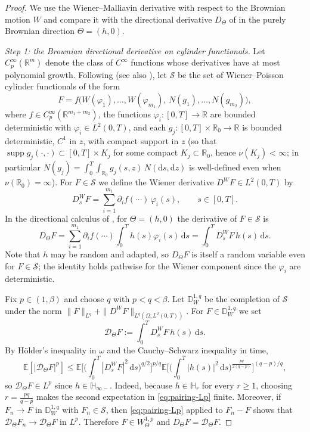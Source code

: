 \documentclass[11pt]{article}
\newcommand{\R}{\mathbb{R}}
\newcommand{\E}{\mathbb{E}}
\newcommand{\Hb}{\mathbb{H}}
\newcommand{\1}{\mathbf{1}}
\newcommand{\dd}{\mathrm{d}}
\newcommand{\supp}{\operatorname{supp}}
\theoremstyle{plain}
\theoremstyle{definition}
\theoremstyle{remark}
\begin{document}
\begin{proof}
We use the Wiener--Malliavin derivative with respect to the Brownian motion $W$ and compare it with the directional derivative $D_\Theta$
of \cite{NakagawaSuzuki2024,SongXie2018} in the purely Brownian direction $\Theta=(h,0)$.

\medskip
\noindent\emph{Step 1: the Brownian directional derivative on cylinder functionals.}
Let $C_p^\infty(\R^m)$ denote the class of $C^\infty$ functions whose derivatives have at most polynomial growth.
Following \cite[Section~2.2]{SongXie2018} (see also \cite[Definition~3.1]{NakagawaSuzuki2024}),
let $\mathcal{S}$ be the set of Wiener--Poisson cylinder functionals of the form
\[
F=f\big(W(\varphi_1),\dots,W(\varphi_{m_1}),\,N(g_1),\dots,N(g_{m_2})\big),
\]
where $f\in C_p^\infty(\R^{m_1+m_2})$, the functions $\varphi_i:[0,T]\to\R$ are bounded deterministic with $\varphi_i\in L^2(0,T)$,
and each $g_j:[0,T]\times\R_0\to\R$ is bounded deterministic, $C^1$ in $z$, with compact support in $z$ (so that $\supp g_j(\cdot,\cdot)\subset[0,T]\times K_j$ for some compact $K_j\subset\R_0$, hence $\nu(K_j)<\infty$; in particular $N(g_j)=\int_0^T\int_{\R_0}g_j(s,z)\,N(\dd s,\dd z)$ is well-defined even when $\nu(\R_0)=\infty$).
For $F\in\mathcal{S}$ we define the Wiener derivative $D^W F\in L^2(0,T)$ by
\[
D_s^W F=\sum_{i=1}^{m_1}\partial_i f(\cdots)\,\varphi_i(s),\qquad s\in[0,T].
\]
In the directional calculus of \cite{NakagawaSuzuki2024,SongXie2018}, for $\Theta=(h,0)$ the derivative of $F\in\mathcal{S}$ is
\[
D_\Theta F=\sum_{i=1}^{m_1}\partial_i f(\cdots)\int_0^T h(s)\varphi_i(s)\,\dd s
=\int_0^T D_s^W F\,h(s)\,\dd s.
\]
Note that $h$ may be random and adapted, so $D_\Theta F$ is itself a random variable even for $F\in\mathcal{S}$;
the identity holds pathwise for the Wiener component since the $\varphi_i$ are deterministic.

Fix $p\in(1,\beta)$ and choose $q$ with $p<q<\beta$.
Let $\mathbb{D}_W^{1,q}$ be the completion of $\mathcal{S}$ under the norm
$\|F\|_{L^q}+\|D^W F\|_{L^q(\Omega;L^2(0,T))}$.
For $F\in\mathbb{D}_W^{1,q}$ we set
\[
\mathcal{D}_\Theta F:=\int_0^T D_s^W F\,h(s)\,\dd s.
\]
By H\"older's inequality in $\omega$ and the Cauchy--Schwarz inequality in time,
\begin{equation}\label{eq:pairing-Lp}
\E[|\mathcal{D}_\Theta F|^p]
\le \E\Big[\Big(\int_0^T |D_s^W F|^2\,\dd s\Big)^{q/2}\Big]^{p/q}
\E\Big[\Big(\int_0^T |h(s)|^2\,\dd s\Big)^{\frac{pq}{2(q-p)}}\Big]^{(q-p)/q},
\end{equation}
so $\mathcal{D}_\Theta F\in L^p$ since $h\in \Hb_{\infty-}$.
Indeed, because $h\in \Hb_r$ for every $r\ge 1$, choosing $r=\frac{pq}{q-p}$ makes the second expectation in \eqref{eq:pairing-Lp} finite.
Moreover, if $F_n\to F$ in $\mathbb{D}_W^{1,q}$ with $F_n\in\mathcal{S}$, then \eqref{eq:pairing-Lp} applied to $F_n-F$ shows that
$\mathcal{D}_\Theta F_n\to\mathcal{D}_\Theta F$ in $L^p$.
Therefore $F\in W^{1,p}_\Theta$ and $D_\Theta F=\mathcal{D}_\Theta F$.


\end{proof}
\end{document}
